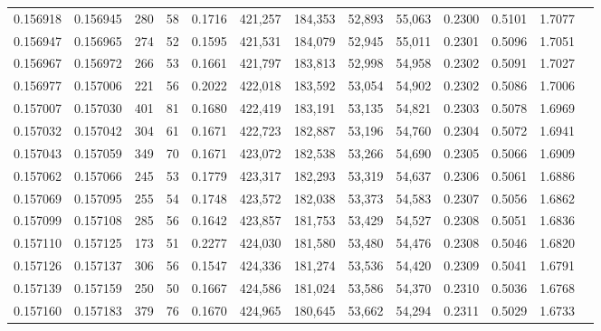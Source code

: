 \begin{tabular}{rrrrrrrrrrrrr}
0.156918 & 0.156945 &   280 &  58 &                                     0.1716 & 421,257 & 184,353 &  52,893 &  55,063 & 0.2300 & 0.5101 & 1.7077 \\
0.156947 & 0.156965 &   274 &  52 &                                     0.1595 & 421,531 & 184,079 &  52,945 &  55,011 & 0.2301 & 0.5096 & 1.7051 \\
0.156967 & 0.156972 &   266 &  53 &                                     0.1661 & 421,797 & 183,813 &  52,998 &  54,958 & 0.2302 & 0.5091 & 1.7027 \\
0.156977 & 0.157006 &   221 &  56 &                                     0.2022 & 422,018 & 183,592 &  53,054 &  54,902 & 0.2302 & 0.5086 & 1.7006 \\
0.157007 & 0.157030 &   401 &  81 &                                     0.1680 & 422,419 & 183,191 &  53,135 &  54,821 & 0.2303 & 0.5078 & 1.6969 \\
0.157032 & 0.157042 &   304 &  61 &                                     0.1671 & 422,723 & 182,887 &  53,196 &  54,760 & 0.2304 & 0.5072 & 1.6941 \\
0.157043 & 0.157059 &   349 &  70 &                                     0.1671 & 423,072 & 182,538 &  53,266 &  54,690 & 0.2305 & 0.5066 & 1.6909 \\
0.157062 & 0.157066 &   245 &  53 &                                     0.1779 & 423,317 & 182,293 &  53,319 &  54,637 & 0.2306 & 0.5061 & 1.6886 \\
0.157069 & 0.157095 &   255 &  54 &                                     0.1748 & 423,572 & 182,038 &  53,373 &  54,583 & 0.2307 & 0.5056 & 1.6862 \\
0.157099 & 0.157108 &   285 &  56 &                                     0.1642 & 423,857 & 181,753 &  53,429 &  54,527 & 0.2308 & 0.5051 & 1.6836 \\
0.157110 & 0.157125 &   173 &  51 &                                     0.2277 & 424,030 & 181,580 &  53,480 &  54,476 & 0.2308 & 0.5046 & 1.6820 \\
0.157126 & 0.157137 &   306 &  56 &                                     0.1547 & 424,336 & 181,274 &  53,536 &  54,420 & 0.2309 & 0.5041 & 1.6791 \\
0.157139 & 0.157159 &   250 &  50 &                                     0.1667 & 424,586 & 181,024 &  53,586 &  54,370 & 0.2310 & 0.5036 & 1.6768 \\
0.157160 & 0.157183 &   379 &  76 &                                     0.1670 & 424,965 & 180,645 &  53,662 &  54,294 & 0.2311 & 0.5029 & 1.6733 \\

\end{tabular}
